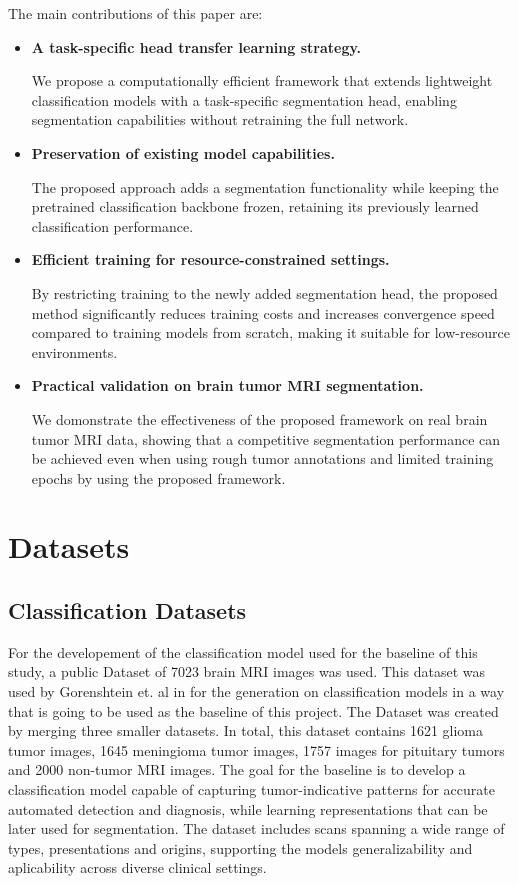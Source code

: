 \documentclass[conference]{IEEEtran}
\begin{document}
The main contributions of this paper are:
\begin{itemize}
  \item \textbf{A task-specific head transfer learning strategy.}
  
  We propose a computationally efficient framework that extends lightweight classification models with a task-specific segmentation head, enabling segmentation capabilities without retraining the full network.
  \item \textbf{Preservation of existing model capabilities.}
  
  The proposed approach adds a segmentation functionality while keeping the pretrained classification backbone frozen, retaining its previously learned classification performance.
  \item \textbf{Efficient training for resource-constrained settings.}
  
  By restricting training to the newly added segmentation head, the proposed method significantly reduces training costs and increases convergence speed compared to training models from scratch, making it suitable for low-resource environments.
  \item \textbf{Practical validation on brain tumor MRI segmentation.}
  
  We domonstrate the effectiveness of the proposed framework on real brain tumor MRI data, showing that a competitive segmentation performance can be achieved even when using rough tumor annotations and limited training epochs by using the proposed framework.
\end{itemize}



\section{Datasets}

\subsection{Classification Datasets}\label{CDAT}

For the developement of the classification model used for the baseline of this study, a public Dataset of 7023 brain MRI images was used\cite{Mso2021Kagg}. This dataset was used by Gorenshtein et. al in \cite{Gorenshtein2025} for the generation on classification models in a way that is going to be used as the baseline of this project. The Dataset was created by merging three smaller datasets. In total, this dataset contains 1621 glioma tumor images, 1645 meningioma tumor images, 1757 images for pituitary tumors and 2000 non-tumor MRI images. The goal for the baseline is to develop a classification model capable of capturing tumor-indicative patterns for accurate automated detection and diagnosis, while learning representations that can be later used for segmentation. The dataset includes scans spanning a wide range of types, presentations and origins, supporting the models generalizability and aplicability across diverse clinical settings.
\end{document}
